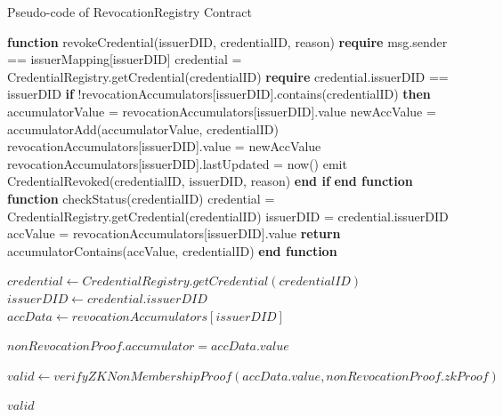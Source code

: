 \documentclass[lettersize,journal]{IEEEtran}
\begin{document}
\begin{algorithm}
\caption{Pseudo-code of RevocationRegistry Contract}
\label{alg:revocation_registry}
\begin{algorithmic}[1]
\STATE \textbf{function} revokeCredential(issuerDID, credentialID, reason)
\STATE \quad \textbf{require} msg.sender == issuerMapping[issuerDID]
\STATE \quad credential = CredentialRegistry.getCredential(credentialID)
\STATE \quad \textbf{require} credential.issuerDID == issuerDID
\STATE \quad \textbf{if} !revocationAccumulators[issuerDID].contains(credentialID) \textbf{then}
\STATE \quad \quad accumulatorValue = revocationAccumulators[issuerDID].value
\STATE \quad \quad newAccValue = accumulatorAdd(accumulatorValue, credentialID)
\STATE \quad \quad revocationAccumulators[issuerDID].value = newAccValue
\STATE \quad \quad revocationAccumulators[issuerDID].lastUpdated = now()
\STATE \quad \quad emit CredentialRevoked(credentialID, issuerDID, reason)
\STATE \quad \textbf{end if}
\STATE \textbf{end function}
\STATE
\STATE \textbf{function} checkStatus(credentialID)
\STATE \quad credential = CredentialRegistry.getCredential(credentialID)
\STATE \quad issuerDID = credential.issuerDID
\STATE \quad accValue = revocationAccumulators[issuerDID].value
\STATE \quad \textbf{return} accumulatorContains(accValue, credentialID)
\STATE \textbf{end function}

    \State $credential \gets CredentialRegistry.getCredential(credentialID)$
    \State $issuerDID \gets credential.issuerDID$
    \State $accData \gets revocationAccumulators[issuerDID]$
    
    \Require $nonRevocationProof.accumulator = accData.value$ 
    
    \State $valid \gets verifyZKNonMembershipProof(accData.value, nonRevocationProof.zkProof)$
    
    \RETURN $valid$
\EndProcedure
\end{algorithmic}
\end{algorithm} 
\end{document}
